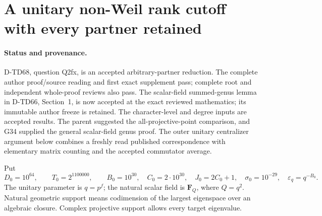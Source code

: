 \section{A unitary non-Weil rank cutoff with every partner retained}
\label{sec:unitary-nonweil-point-cutoff}

\paragraph{Status and provenance.}
D-TD68, question Q2fx, is an accepted arbitrary-partner reduction.
The complete author proof/source reading and first exact supplement pass;
complete root and independent whole-proof reviews also pass. The
scalar-field summed-genus lemma in D-TD66, Section~1, is now accepted
at the exact reviewed mathematics; its immutable author freeze is retained.
The character-level and degree inputs are accepted results. The parent
suggested the all-projective-point comparison, and G34 supplied the
general scalar-field genus proof. The outer unitary centralizer argument
below combines a freshly read published correspondence with elementary
matrix counting and the accepted commutator average.

Put
\[
 D_0=10^{64},\qquad T_0=2^{1100000},\qquad B_0=10^{30},
 \quad C_0=2\cdot10^{30},\quad J_0=2C_0+1,
 \quad \sigma_0=10^{-29},\quad \varepsilon_q=q^{-B_0}.
 \tag{UPL.1}
\]
The unitary parameter is \(q=p^f\); the natural scalar field is
\(\mathbf F_Q\), where \(Q=q^2\). Natural geometric support means
codimension of the largest eigenspace over an algebraic closure.
Complex projective support allows every target eigenvalue.

